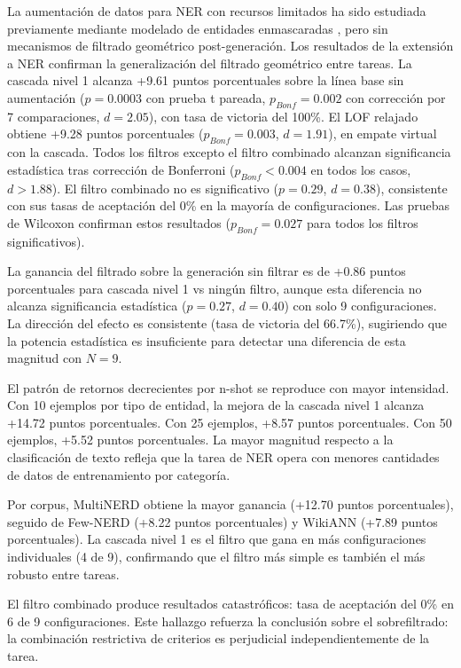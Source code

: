 La aumentación de datos para NER con recursos limitados ha sido estudiada previamente mediante modelado de entidades enmascaradas \cite{zhou2022melm}, pero sin mecanismos de filtrado geométrico post-generación. Los resultados de la extensión a NER confirman la generalización del filtrado geométrico entre tareas. La cascada nivel 1 alcanza +9.61 puntos porcentuales sobre la línea base sin aumentación ($p = 0.0003$ con prueba t pareada, $p_{Bonf} = 0.002$ con corrección por 7 comparaciones, $d = 2.05$), con tasa de victoria del 100\%. El LOF relajado obtiene +9.28 puntos porcentuales ($p_{Bonf} = 0.003$, $d = 1.91$), en empate virtual con la cascada. Todos los filtros excepto el filtro combinado alcanzan significancia estadística tras corrección de Bonferroni ($p_{Bonf} < 0.004$ en todos los casos, $d > 1.88$). El filtro combinado no es significativo ($p = 0.29$, $d = 0.38$), consistente con sus tasas de aceptación del 0\% en la mayoría de configuraciones. Las pruebas de Wilcoxon confirman estos resultados ($p_{Bonf} = 0.027$ para todos los filtros significativos).

La ganancia del filtrado sobre la generación sin filtrar es de +0.86 puntos porcentuales para cascada nivel 1 vs ningún filtro, aunque esta diferencia no alcanza significancia estadística ($p = 0.27$, $d = 0.40$) con solo 9 configuraciones. La dirección del efecto es consistente (tasa de victoria del 66.7\%), sugiriendo que la potencia estadística es insuficiente para detectar una diferencia de esta magnitud con $N = 9$.

El patrón de retornos decrecientes por n-shot se reproduce con mayor intensidad. Con 10 ejemplos por tipo de entidad, la mejora de la cascada nivel 1 alcanza +14.72 puntos porcentuales. Con 25 ejemplos, +8.57 puntos porcentuales. Con 50 ejemplos, +5.52 puntos porcentuales. La mayor magnitud respecto a la clasificación de texto refleja que la tarea de NER opera con menores cantidades de datos de entrenamiento por categoría.

Por corpus, MultiNERD obtiene la mayor ganancia (+12.70 puntos porcentuales), seguido de Few-NERD (+8.22 puntos porcentuales) y WikiANN (+7.89 puntos porcentuales). La cascada nivel 1 es el filtro que gana en más configuraciones individuales (4 de 9), confirmando que el filtro más simple es también el más robusto entre tareas.

El filtro combinado produce resultados catastróficos: tasa de aceptación del 0\% en 6 de 9 configuraciones. Este hallazgo refuerza la conclusión sobre el sobrefiltrado: la combinación restrictiva de criterios es perjudicial independientemente de la tarea.

